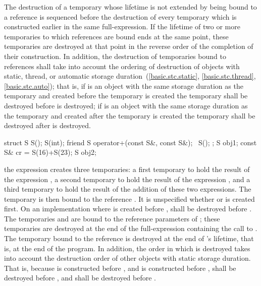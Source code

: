 The destruction of a temporary whose lifetime is not extended by being
bound to a reference is sequenced before the destruction of every
temporary which is constructed earlier in the same full-expression.
If the lifetime of two or more temporaries to which references are bound ends
at the same point,
these temporaries are destroyed at that point in the reverse order of the
completion of their construction.
In addition, the destruction of temporaries bound to references shall
take into account the ordering of destruction of objects with static, thread, or
automatic storage duration~(\ref{basic.stc.static}, \ref{basic.stc.thread}, \ref{basic.stc.auto});
that is, if
is an object with the same storage duration as the temporary and
created before the temporary is created 
the temporary shall be destroyed before
is destroyed;
if
is an object with the same storage duration as the temporary and
created after the temporary is created
the temporary shall be destroyed after
is destroyed.
\enterexample

\begin{codeblock}
struct S {
  S();
  S(int);
  friend S operator+(const S&, const S&);
  ~S();
};
S obj1;
const S& cr = S(16)+S(23);
S obj2;
\end{codeblock}

the expression
creates three temporaries:
a first temporary
to hold the result of the expression
,
a second temporary
to hold the result of the expression
,
and a third temporary
to hold the result of the addition of these two expressions.
The temporary
is then bound to the reference
.
It is unspecified whether
or
is created first.
On an implementation where
is created before
,
shall be destroyed before
.
The temporaries
and
are bound to the reference parameters of
;
these temporaries are destroyed at the end of the full-expression
containing the call to
.
The temporary
bound to the reference
is destroyed at the end of
's
lifetime, that is, at the end of the program.
In addition, the order in which
is destroyed takes into account the destruction order of other objects with
static storage duration.
That is, because
is constructed before
,
and
is constructed before
,
shall be destroyed before
,
and
shall be destroyed before
.
\exitexample

